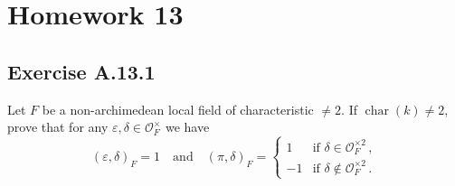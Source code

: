 \documentclass[12pt, a4paper]{article}
\begin{document}
\section*{Homework 13}
\subsection*{Exercise A.13.1}
Let $F$ be a non-archimedean local field of characteristic $\neq 2$. If $\operatorname{char}(k) \neq 2$, prove that for any $\varepsilon, \delta \in \mathcal{O}_F^\times$ we have
\[ (\varepsilon, \delta)_F = 1 \quad \text{and} \quad (\pi, \delta)_F = \begin{cases} 1 & \text{if } \delta \in \mathcal{O}_F^{\times 2} \,, \\ -1 & \text{if } \delta \notin \mathcal{O}_F^{\times 2} \,. \end{cases} \]
\end{document}
